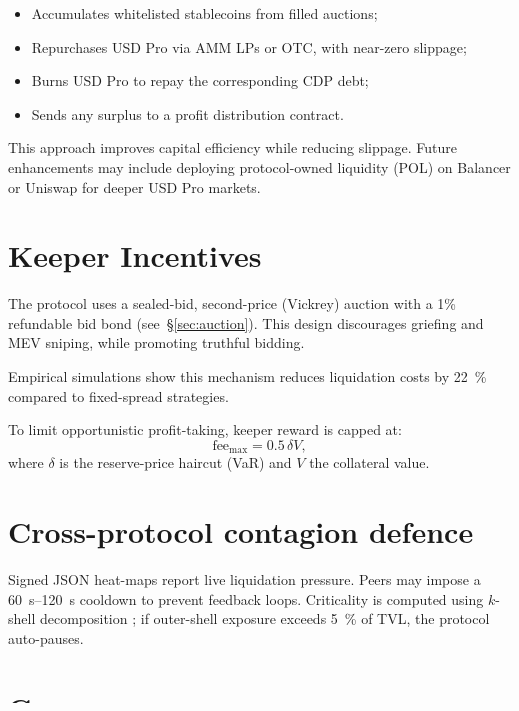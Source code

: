 \documentclass[11pt]{article}
\begin{document}
\begin{itemize}
  \item Accumulates whitelisted stablecoins from filled auctions;
  \item Repurchases USD Pro via AMM LPs or OTC, with near-zero slippage;
  \item Burns USD Pro to repay the corresponding CDP debt;
  \item Sends any surplus to a profit distribution contract.
\end{itemize}

This approach improves capital efficiency while reducing slippage.  
Future enhancements may include deploying protocol-owned liquidity (POL) on Balancer or Uniswap for deeper USD Pro markets.


\section{Keeper Incentives}
The protocol uses a sealed-bid, second-price (Vickrey) auction with a 1\% refundable bid bond (see~§\ref{sec:auction}).  
This design discourages griefing and MEV sniping, while promoting truthful bidding.

Empirical simulations \parencite{tian2025defi} show this mechanism reduces liquidation costs by \SI{22}{\percent} compared to fixed-spread strategies.

To limit opportunistic profit-taking, keeper reward is capped at:
\[
\text{fee}_{\max} = 0.5\,\delta V,
\]
where \( \delta \) is the reserve-price haircut (VaR) and \( V \) the collateral value.


\section{Cross-protocol contagion defence}
\label{sec:contagion}
Signed JSON heat-maps report live liquidation pressure.  
Peers may impose a \SIrange{60}{120}{\second} cooldown to prevent feedback loops.  
Criticality is computed using $k$-shell decomposition \parencite{battiston2016debtrank};  
if outer-shell exposure exceeds \SI{5}{\percent} of TVL, the protocol auto-pauses.

\section{Governance}
\label{sec:governance}
The proposed architecture delegates control of key risk parameters \((\kappa, Y, \psi, \delta)\) to an on-chain governance module, \texttt{RiskConfig}, which is secured by a 7-day timelock to allow community review and prevent instant changes.
\end{document}
